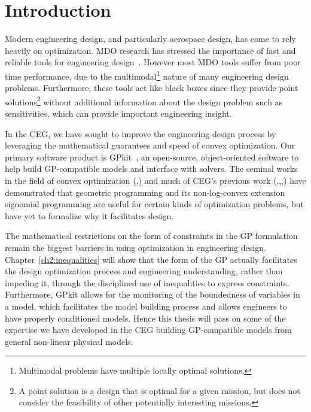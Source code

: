 \chapter{Introduction}
\label{ch1_intro}

Modern engineering design, and particularly aerospace design, has come to rely
heavily on optimization. \gls{MDO} research has stressed
the importance of fast and
reliable tools for engineering design~\cite{martins_mdo}.
However most \gls{MDO} tools
suffer from poor time performance,
due to the multimodal\footnote{Multimodal problems have multiple
locally optimal solutions.} nature of many
engineering design problems.
Furthermore, these tools act like black boxes since
they provide point solutions\footnote{A point solution is a design that
is optimal for a given mission, but does not consider the
feasibility of other potentially interesting missions.}
without additional information about the design problem
such as sensitivities,
which can provide important engineering insight.

In the \gls{CEG}, we have sought to improve the engineering design process by
leveraging the mathematical guarantees and speed of convex optimization.
Our primary software product is GPkit~\cite{gpkit}, an
open-source, object-oriented software to help build \gls{GP}-compatible models and
interface with solvers. The seminal works
in the field of convex optimization (\cite{gpintro},\cite{duffingp}) and much of \gls{CEG}'s previous work
(\cite{gp_ac_design},\cite{power_of_log},\cite{sp_ac_design},\cite{sp_engine}) have demonstrated that
geometric programming and its non-log-convex extension signomial programming
are useful for certain kinds of
optimization problems, but have yet to formalize why it
facilitates design.

The mathematical restrictions on the form of constraints in the \gls{GP} formulation
remain the biggest
barriers in using optimization in engineering design. Chapter~\ref{ch2:inequalities} will
show that the form of the \gls{GP} actually facilitates the design
optimization process
and engineering understanding, rather than impeding it, through the disciplined use
of inequalities to express constraints.
Furthermore, GPkit allows for the
monitoring of the boundedness of variables in a model, which facilitates the model
building process and allows engineers
to have properly conditioned models. Hence this thesis will
pass on some of the expertise we have developed in the \gls{CEG} building
\gls{GP}-compatible models from general non-linear physical models.

